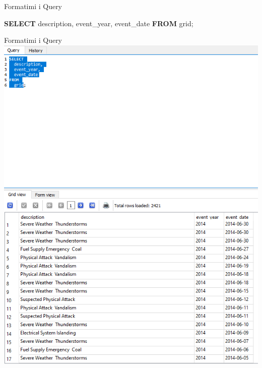 \documentclass[
  ignorenonframetext,
]{beamer}
\newenvironment{Shaded}{\begin{snugshade}}{\end{snugshade}}
\newcommand{\KeywordTok}[1]{\textcolor[rgb]{0.13,0.29,0.53}{\textbf{#1}}}
\newcommand{\NormalTok}[1]{#1}
\begin{document}
\begin{frame}[fragile]{Formatimi i Query}
\label{formatimi-i-query-5}

\begin{Shaded}
\begin{Highlighting}[]
\KeywordTok{SELECT} 
\NormalTok{  description, }
\NormalTok{  event\_year, }
\NormalTok{  event\_date}
\KeywordTok{FROM} 
\NormalTok{  grid;}
\end{Highlighting}
\end{Shaded}
\end{frame}

\begin{frame}{Formatimi i Query}
\label{formatimi-i-query-6}
\includegraphics{./Figs/sql16.png}
\end{frame}
\end{document}
